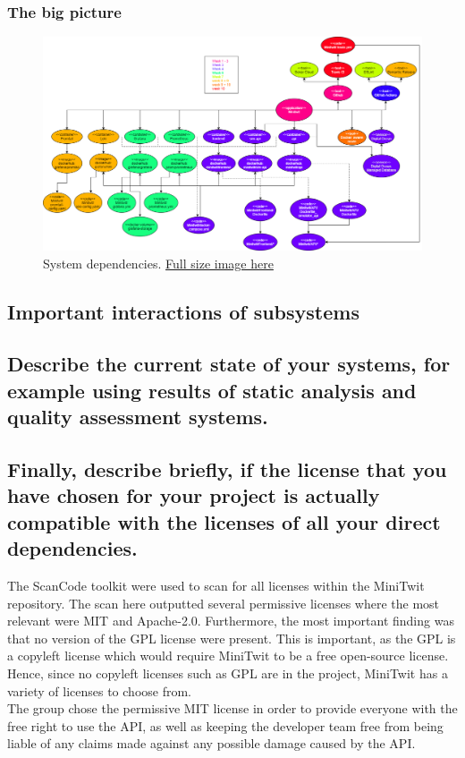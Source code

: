 \subsubsection{The big picture}


\begin{figure}[H]
    \centering
    \includegraphics[scale=0.25]{report/images/system-dependencies.png}
    \caption{System dependencies. \href{https://www.google.dk/}{Full size image here}}
    \label{fig:system-depencencies}
\end{figure}

\subsection{Important interactions of subsystems}

\subsection{Describe the current state of your systems, for example using results of static analysis and quality assessment systems.}


\subsection{Finally, describe briefly, if the license that you have chosen for your project is actually compatible with the licenses of all your direct dependencies.}
The ScanCode toolkit\cite{scancode} were used to scan for all licenses within the MiniTwit repository. The scan here outputted several permissive licenses where the most relevant were MIT and Apache-2.0. Furthermore, the most important finding was that no version of the GPL license were present. This is important, as the GPL is a copyleft license which would require MiniTwit to be a free open-source license\cite{gpl}. Hence, since no copyleft licenses such as GPL are in the project, MiniTwit has a variety of licenses to choose from.\\
The group chose the permissive MIT license in order to provide everyone with the free right to use the API, as well as keeping the developer team free from being liable of any claims made against any possible damage caused by the API.

